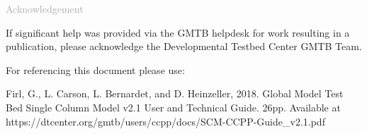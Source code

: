 \begin{titlepage}
\vspace*{0.5cm}
\noindent

\begin{flushleft}
\textcolor{darkgray}{\LARGE Acknowledgement}
\vspace*{1cm}\par

If significant help was provided via the GMTB helpdesk for work resulting in a publication, please acknowledge the Developmental Testbed Center GMTB Team.\\
\vspace*{1cm}\par
For referencing this document please use:\\
\vspace*{1cm}\par
Firl, G., L. Carson, L. Bernardet, and D. Heinzeller, 2018. Global Model Test Bed Single Column Model v2.1 User and Technical Guide. 26pp. Available at https://dtcenter.org/gmtb/users/ccpp/docs/SCM-CCPP-Guide\_v2.1.pdf

\end{flushleft}
\end{titlepage}
\pagebreak{}
